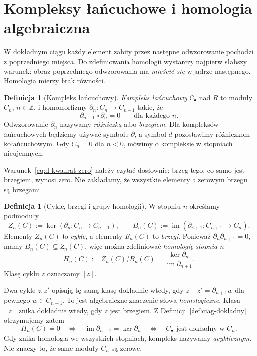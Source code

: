 \documentclass[11pt,a4paper,oneside]{report}
\newcommand{\Z}{\mathbb{Z}}
\theoremstyle{plain}
\theoremstyle{definition}
\newtheorem{definicja}[twierdzenie]{Definicja}
\theoremstyle{remark}
\begin{document}
\section{Kompleksy łańcuchowe i homologia algebraiczna}
\label{sec:kompleks-homologia}

W dokładnym ciągu każdy element zabity przez
następne odwzorowanie pochodzi z poprzedniego miejsca.
Do zdefiniowania homologii wystarczy najpierw
słabszy warunek: obraz poprzedniego odwzorowania ma
\emph{mieścić się} w jądrze następnego.
Homologia mierzy brak równości.

\begin{definicja}[Kompleks łańcuchowy]
\label{def:kompleks-lancuchowy}
\emph{Kompleks łańcuchowy} $C_\bullet$ nad $R$
to moduły $C_n$, $n\in\Z$, i homomorfizmy
$\partial_n:C_n\to C_{n-1}$ takie, że
\begin{equation}\label{eq:d-kwadrat-zero}
 \partial_{n-1}\circ \partial_n=0\qquad\text{dla każdego }n.
\end{equation}
Odwzorowanie $\partial_n$ nazywamy \emph{różniczką} albo
\emph{brzegiem}. Dla kompleksów łańcuchowych
będziemy używać symbolu $\partial$, a symbol $d$
pozostawimy różniczkom kołańcuchowym.
Gdy $C_n=0$ dla $n<0$,
mówimy o kompleksie w stopniach nieujemnych.
\end{definicja}

Warunek~\eqref{eq:d-kwadrat-zero} należy czytać
dosłownie: brzeg tego, co samo jest brzegiem,
wynosi zero. Nie zakładamy, że wszystkie
elementy o zerowym brzegu są brzegami.

\begin{definicja}[Cykle, brzegi i grupy homologii]
\label{def:homologia-algebraiczna}
W stopniu $n$ określamy podmoduły
\[
 Z_n(C):=\ker(\partial_n:C_n\to C_{n-1}),\qquad
 B_n(C):=\operatorname{im}(\partial_{n+1}:C_{n+1}\to C_n).
\]
Elementy $Z_n(C)$ to \emph{cykle}, a elementy
$B_n(C)$ to \emph{brzegi}. Ponieważ
$\partial_n\partial_{n+1}=0$, mamy $B_n(C)\subseteq Z_n(C)$,
więc można zdefiniować \emph{homologię stopnia $n$}
\begin{equation}\label{eq:homologia-def}
 H_n(C):=Z_n(C)/B_n(C)
 =\frac{\ker \partial_n}{\operatorname{im}\partial_{n+1}}.
\end{equation}
Klasę cyklu $z$ oznaczamy $[z]$.
\end{definicja}

Dwa cykle $z,z'$ opisują tę samą klasę dokładnie
wtedy, gdy $z-z'=\partial_{n+1}w$ dla pewnego
$w\in C_{n+1}$. To jest algebraiczne
znaczenie słowa \emph{homologiczne}.
Klasa $[z]$ znika dokładnie wtedy, gdy
$z$ jest brzegiem. Z Definicji~\ref{def:ciag-dokladny}
otrzymujemy zatem
\[
 H_n(C)=0
 \quad\Longleftrightarrow\quad
 \operatorname{im}\partial_{n+1}=\ker \partial_n
 \quad\Longleftrightarrow\quad
 C_\bullet\text{ jest dokładny w }C_n.
\]
Gdy znika homologia we wszystkich stopniach,
kompleks nazywamy \emph{acyklicznym}.
Nie znaczy to, że same moduły $C_n$ są zerowe.
\end{document}
